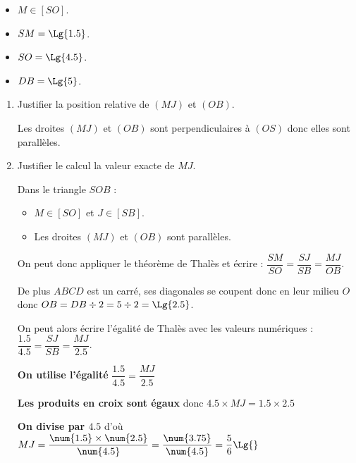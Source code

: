 \begin{corrige}
\begin{minipage}{0.5\linewidth}
{    
        }
    \end{minipage}
    \begin{minipage}{0.45\linewidth}
        \begin{itemize}
            \item $M \in [SO]$.
            \item $SM=\Lg{1.5}$.
            \item $SO=\Lg{4.5}$.
            \item $DB=\Lg{5}$.
        \end{itemize}
    \end{minipage}

    \begin{enumerate}
        \item Justifier la position relative de $(MJ)$ et $(OB)$.
        
        {\color{red} Les droites $(MJ)$ et $(OB)$ sont perpendiculaires à $(OS)$ donc elles sont parallèles.        
        }
        \item Justifier le calcul la valeur exacte de $MJ$.
        
        {\color{red} Dans le triangle $SOB$ :
        \begin{itemize}
            \item $M \in [SO]$ et $J \in [SB]$.
            \item Les droites $(MJ)$ et $(OB)$ sont parallèles.
        \end{itemize}        
        On peut donc appliquer le théorème de Thalès et écrire : $\dfrac{SM}{SO}=\dfrac{SJ}{SB}=\dfrac{MJ}{OB}$.

        \smallskip
        De plus $ABCD$ est un carré, ses diagonales se coupent donc en leur milieu $O$ donc $OB=DB\div 2 = 5\div 2 = \Lg{2.5}$.

        On peut alors écrire l'égalité de Thalès avec les valeurs numériques : $\dfrac{\num{1.5}}{\num{4.5}}=\dfrac{SJ}{SB}=\dfrac{MJ}{\num{2.5}}$.

        \textbf{On utilise l'égalité} $\dfrac{\num{1.5}}{\num{4.5}}=\dfrac{MJ}{\num{2.5}}$ 

        \textbf{Les produits en croix sont égaux} donc $\num{4.5}\times MJ=\num{1.5}\times \num{2.5}$
        
        \smallskip
        \textbf{On divise par $\num{4.5}$} d'où $MJ=\dfrac{\num{1.5}\times \num{2.5}}{\num{4.5}}=\dfrac{\num{3.75}}{\num{4.5}}=\dfrac{5}{6} \Lg{}$         
        }
    \end{enumerate}
\end{corrige}

